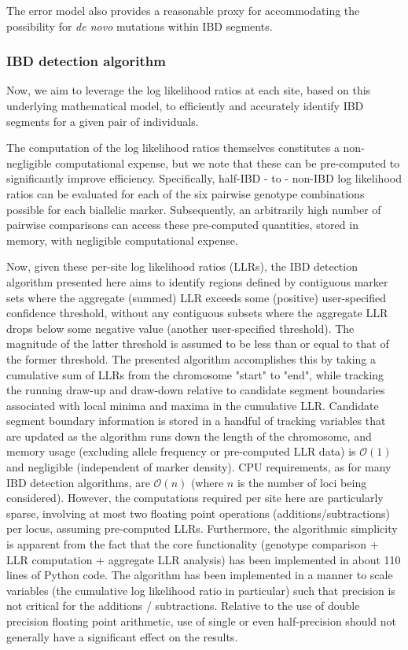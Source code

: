 \documentclass{article}
\begin{document}
The error model also provides a reasonable proxy for accommodating the possibility for \textit{de novo} mutations within IBD segments.

\subsubsection{IBD detection algorithm}
Now, we aim to leverage the log likelihood ratios at each site, based on this underlying mathematical model, to efficiently and accurately identify IBD segments for a given pair of individuals. 

The computation of the log likelihood ratios themselves constitutes a non-negligible computational expense, but we note that these can be pre-computed to significantly improve efficiency. Specifically, half-IBD - to - non-IBD log likelihood ratios can be evaluated for each of the six pairwise genotype combinations possible for each biallelic marker. Subsequently, an arbitrarily high number of pairwise comparisons can access these pre-computed quantities, stored in memory, with negligible computational expense.

Now, given these per-site log likelihood ratios (LLRs), the IBD detection algorithm presented here aims to identify regions defined by contiguous marker sets where the aggregate (summed) LLR exceeds some (positive) user-specified confidence threshold, without any contiguous subsets where the aggregate LLR drops below some negative value (another user-specified threshold). The magnitude of the latter threshold is assumed to be less than or equal to that of the former threshold. The presented algorithm accomplishes this by taking a cumulative sum of LLRs from the chromosome "start" to "end", while tracking the running draw-up and draw-down relative to candidate segment boundaries associated with local minima and maxima in the cumulative LLR. Candidate segment boundary information is stored in a handful of tracking variables that are updated as the algorithm runs down the length of the chromosome, and memory usage (excluding allele frequency or pre-computed LLR data) is $\mathcal{O}(1)$ and negligible (independent of marker density). CPU requirements, as for many IBD detection algorithms, are $\mathcal{O}(n)$ (where $n$ is the number of loci being considered). However, the computations required per site here are particularly sparse, involving at most two floating point operations (additions/subtractions) per locus, assuming pre-computed LLRs. Furthermore, the algorithmic simplicity is apparent from the fact that the core functionality (genotype comparison + LLR computation +  aggregate LLR analysis) has been implemented in about 110 lines of Python code. The algorithm has been implemented in a manner to scale variables (the cumulative log likelihood ratio in particular) such that precision is not critical for the additions / subtractions. Relative to the use of double precision floating point arithmetic, use of single or even half-precision should not generally have a significant effect on the results.
\end{document}
